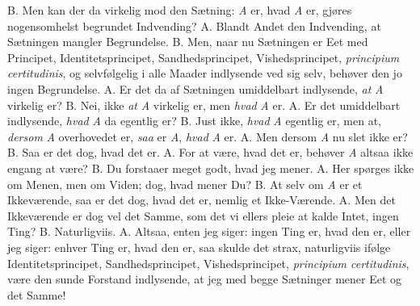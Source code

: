 \documentclass[12pt,a4paper]{book}
\begin{document}
B. Men kan der da virkelig mod den Sætning: \textit{A} er, hvad
\textit{A} er, gjøres nogensomhelst begrundet Indvending? A. Blandt
Andet den Indvending, at Sætningen mangler Begrundelse. B. Men, naar
nu Sætningen er Eet med Principet, Identitetsprincipet,
Sandhedsprincipet, Vishedsprincipet, \textit{principium certitudinis},
og selvfølgelig i alle Maader indlysende ved sig selv, behøver den jo
ingen Begrundelse. A. Er det da af Sætningen umiddelbart indlysende,
\emph{at} \textit{A} virkelig er? B. Nei, ikke \emph{at} \textit{A}
virkelig er, men \emph{hvad} \textit{A} er. A. Er det umiddelbart
indlysende, \emph{hvad} \textit{A} da egentlig er? B. Just ikke,
\emph{hvad} \textit{A} egentlig er, men at, \emph{dersom} \textit{A}
overhovedet er, \emph{saa} er \textit{A}, \emph{hvad} \textit{A} er.
A. Men dersom \textit{A} nu slet ikke er? B. Saa er det dog, hvad det
er. A. For at være, hvad det er, behøver \textit{A} altsaa ikke engang
at være? B. Du forstaaer meget godt, hvad jeg mener. A. Her spørges
ikke om Menen, men om Viden;
dog, hvad mener Du? B. At selv om \textit{A} er et Ikkeværende, saa er
det dog, hvad det er, nemlig et Ikke-Værende. A. Men det Ikkeværende
er dog vel det Samme, som det vi ellers pleie at kalde Intet, ingen
Ting? B. Naturligviis. A. Altsaa, enten jeg siger: ingen Ting er,
hvad den er, eller jeg siger: enhver Ting er, hvad den er, saa skulde
det strax, naturligviis ifølge Identitetsprincipet, Sandhedsprincipet,
Vishedsprincipet, \textit{principium certitudinis}, være den sunde
Forstand indlysende, at jeg med begge Sætninger mener Eet og det Samme!
\end{document}
